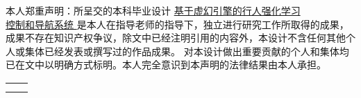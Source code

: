 
\begin{declarationzh}
		
本人郑重声明：所呈交的本科毕业设计 \uline{ 基于虚幻引擎的行人强化学习\\控制和导航系统 } 是本人在指导老师的指导下，独立进行研究工作所取得的成果，成果不存在知识产权争议，除文中已经注明引用的内容外，本设计不含任何其他个人或集体已经发表或撰写过的作品成果。
对本设计做出重要贡献的个人和集体均已在文中以明确方式标明。本人完全意识到本声明的法律结果由本人承担。
	
	\vspace{30pt}
	\begin{tabular}{ll}
		\hspace{240pt} \makebox[4em][s]{作者签名：} & \underline{\makebox[100pt][c]{  }} \\
		\hspace{240pt} \makebox[4em][s]{日\qquad 期:}	 &
		\underline{\makebox[100pt][c]{\qquad 年\quad 月\quad   日 }} \\
	\end{tabular}

	
	
\end{declarationzh}
